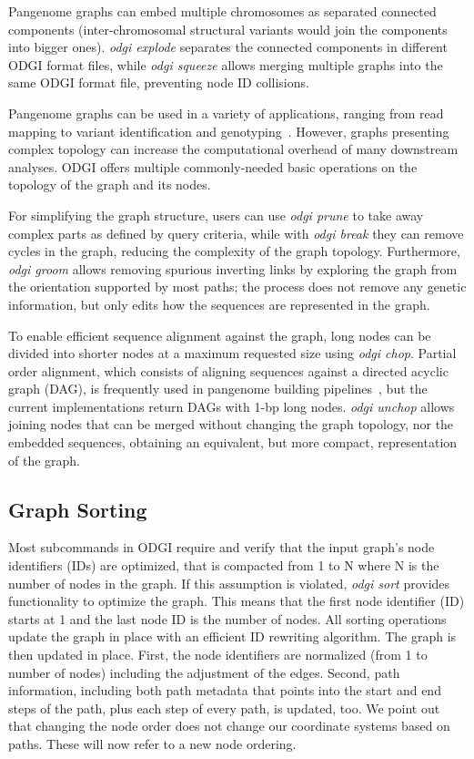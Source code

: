 \documentclass{bioinfo}
\begin{document}
Pangenome graphs can embed multiple chromosomes as separated connected components (inter-chromosomal structural variants would join the components into bigger ones).
\textit{odgi explode} separates the connected components in different ODGI format files, while \textit{odgi squeeze} allows merging multiple graphs into the same ODGI format file, preventing node ID collisions.

Pangenome graphs can be used in a variety of applications, ranging from read mapping to variant identification and genotyping~\citep{Eizenga_2020}.
However, graphs presenting complex topology can increase the computational overhead of many downstream analyses.
ODGI offers multiple commonly-needed basic operations on the topology of the graph and its nodes.

For simplifying the graph structure, users can use \textit{odgi prune} to take away complex parts as defined by query criteria,
while with \textit{odgi break} they can remove cycles in the graph, reducing the complexity of the graph topology.
Furthermore, \textit{odgi groom} allows removing spurious inverting links by exploring the graph from the orientation supported by most paths;
the process does not remove any genetic information, but only edits how the sequences are represented in the graph.

To enable efficient sequence alignment against the graph, long nodes can be divided into shorter nodes at a maximum requested size using \textit{odgi chop}.
Partial order alignment, which consists of aligning sequences against a directed acyclic graph (DAG), is frequently used in pangenome building pipelines~\citep{pggb}, but the current implementations return DAGs with 1-bp long nodes.
\textit{odgi unchop} allows joining nodes that can be merged without changing the graph topology, nor the embedded sequences, obtaining an equivalent, but more compact, representation of the graph.

\subsection{Graph Sorting}
\label{sec:supp_sorting}
Most subcommands in ODGI require and verify that the input graph’s node identifiers (IDs) are optimized, that is compacted from 1 to N where N is the number of nodes in the graph. 
If this assumption is violated, \textit{odgi sort} provides functionality to optimize the graph. 
This means that the first node identifier (ID) starts at 1 and the last node ID is the number of nodes. 
All sorting operations update the graph in place with an efficient ID rewriting algorithm.
The graph is then updated in place. 
First, the node identifiers are normalized (from 1 to number of nodes) including the adjustment of the edges. 
Second, path information, including both path metadata that points into the start and end steps of the path, plus each step of every path, is updated, too. 
We point out that changing the node order does not change our coordinate systems based on paths. 
These will now refer to a new node ordering.
\end{document}
